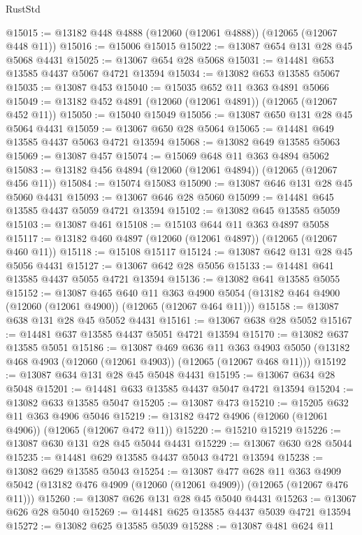 \begin{lexlean}{RustStd}
\begin{coremodule}
@15015 := @13182 @448 @4888 (@12060 (@12061 @4888)) (@12065 (@12067 @448 @11))
@15016 := @15006 @15015
@15022 := @13087 @654 @131 @28 @45 @5068 @4431
@15025 := @13067 @654 @28 @5068
@15031 := @14481 @653 @13585 @4437 @5067 @4721 @13594
@15034 := @13082 @653 @13585 @5067
@15035 := @13087 @453
@15040 := @15035 @652 @11 @363 @4891 @5066
@15049 := @13182 @452 @4891 (@12060 (@12061 @4891)) (@12065 (@12067 @452 @11))
@15050 := @15040 @15049
@15056 := @13087 @650 @131 @28 @45 @5064 @4431
@15059 := @13067 @650 @28 @5064
@15065 := @14481 @649 @13585 @4437 @5063 @4721 @13594
@15068 := @13082 @649 @13585 @5063
@15069 := @13087 @457
@15074 := @15069 @648 @11 @363 @4894 @5062
@15083 := @13182 @456 @4894 (@12060 (@12061 @4894)) (@12065 (@12067 @456 @11))
@15084 := @15074 @15083
@15090 := @13087 @646 @131 @28 @45 @5060 @4431
@15093 := @13067 @646 @28 @5060
@15099 := @14481 @645 @13585 @4437 @5059 @4721 @13594
@15102 := @13082 @645 @13585 @5059
@15103 := @13087 @461
@15108 := @15103 @644 @11 @363 @4897 @5058
@15117 := @13182 @460 @4897 (@12060 (@12061 @4897)) (@12065 (@12067 @460 @11))
@15118 := @15108 @15117
@15124 := @13087 @642 @131 @28 @45 @5056 @4431
@15127 := @13067 @642 @28 @5056
@15133 := @14481 @641 @13585 @4437 @5055 @4721 @13594
@15136 := @13082 @641 @13585 @5055
@15152 := @13087
    @465
    @640
    @11
    @363
    @4900
    @5054
    (@13182 @464 @4900 (@12060 (@12061 @4900)) (@12065 (@12067 @464 @11)))
@15158 := @13087 @638 @131 @28 @45 @5052 @4431
@15161 := @13067 @638 @28 @5052
@15167 := @14481 @637 @13585 @4437 @5051 @4721 @13594
@15170 := @13082 @637 @13585 @5051
@15186 := @13087
    @469
    @636
    @11
    @363
    @4903
    @5050
    (@13182 @468 @4903 (@12060 (@12061 @4903)) (@12065 (@12067 @468 @11)))
@15192 := @13087 @634 @131 @28 @45 @5048 @4431
@15195 := @13067 @634 @28 @5048
@15201 := @14481 @633 @13585 @4437 @5047 @4721 @13594
@15204 := @13082 @633 @13585 @5047
@15205 := @13087 @473
@15210 := @15205 @632 @11 @363 @4906 @5046
@15219 := @13182 @472 @4906 (@12060 (@12061 @4906)) (@12065 (@12067 @472 @11))
@15220 := @15210 @15219
@15226 := @13087 @630 @131 @28 @45 @5044 @4431
@15229 := @13067 @630 @28 @5044
@15235 := @14481 @629 @13585 @4437 @5043 @4721 @13594
@15238 := @13082 @629 @13585 @5043
@15254 := @13087
    @477
    @628
    @11
    @363
    @4909
    @5042
    (@13182 @476 @4909 (@12060 (@12061 @4909)) (@12065 (@12067 @476 @11)))
@15260 := @13087 @626 @131 @28 @45 @5040 @4431
@15263 := @13067 @626 @28 @5040
@15269 := @14481 @625 @13585 @4437 @5039 @4721 @13594
@15272 := @13082 @625 @13585 @5039
@15288 := @13087
    @481
    @624
    @11

\end{coremodule}
\end{lexlean}
